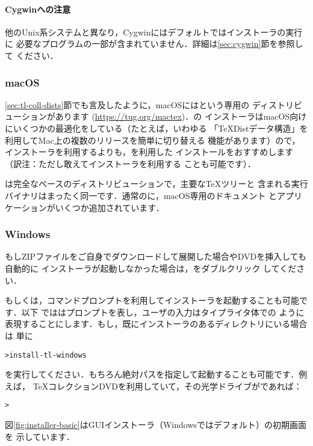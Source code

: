 \documentclass[uplatex,dvipdfmx,tombow]{jsarticle}
\begin{document}
\paragraph{Cygwinへの注意}
他のUnix系システムと異なり，Cygwinにはデフォルトでは\TL インストーラの実行に
必要なプログラムの一部が含まれていません．詳細は\ref{sec:cygwin}節を参照して
ください．

\subsubsection{macOS}
\label{sec:macos}

\ref{sec:tl-coll-dists}節でも言及したように，macOSには\MacTeX という専用の
ディストリビューションがあります (\url{https://tug.org/mactex})．\MacTeX の
インストーラはmacOS向けにいくつかの最適化をしている（たとえば，いわゆる
「{\TeX}Distデータ構造」を利用してMac上の複数の\TL リリースを簡単に切り替える
機能があります）ので，\TL インストーラを利用するよりも，\MacTeX を利用した
インストールをおすすめします（訳注：ただし敢えて\TL インストーラを利用する
ことも可能です）．

\MacTeX は完全な\TL ベースのディストリビューションで，主要な\TeX ツリーと
含まれる実行バイナリはまったく同一です．通常の\TL に，macOS専用のドキュメント
とアプリケーションがいくつか追加されています．

\subsubsection{Windows}\label{sec:wininst}

もしZIPファイルをご自身でダウンロードして展開した場合やDVDを挿入しても自動的に
インストーラが起動しなかった場合は，をダブルクリック
してください．

もしくは，コマンドプロンプトを利用してインストーラを起動することも可能です．以下
では\code{>}はプロンプトを表し，ユーザの入力はタイプライタ体での
ように表現することにします．もし，既にインストーラのあるディレクトリにいる場合は
単に
%
\begin{alltt}
> install-tl-windows
\end{alltt}
%
を実行してください．もちろん絶対パスを指定して起動することも可能です．例えば，
\TeX コレクションDVDを利用していて，その光学ドライブがであれば：
%
\begin{alltt}
> 
\end{alltt}
%
図\ref{fig:installer-basic}はGUIインストーラ（Windowsではデフォルト）の初期画面を
示しています．
\end{document}
